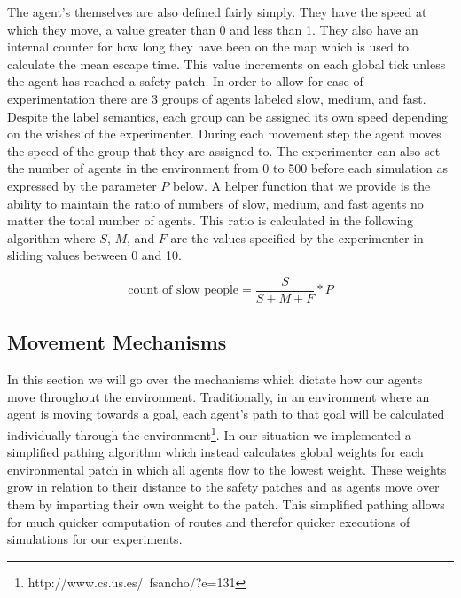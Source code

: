 \documentclass[12pt,letterpaper]{article}
\begin{document}
The agent's themselves are also defined fairly simply.  They have the speed at which they move, a value greater than 0 and less than 1.  They also have an internal counter for how long they have been on the map which is used to calculate the mean escape time.  This value increments on each global tick unless the agent has reached a safety patch.  In order to allow for ease of experimentation there are 3 groups of agents labeled slow, medium, and fast.  Despite the label semantics, each group can be assigned its own speed depending on the wishes of the experimenter.  During each movement step the agent moves the speed of the group that they are assigned to.  The experimenter can also set the number of agents in the environment from 0 to 500 before each simulation as expressed by the parameter $P$ below.  A helper function that we provide is the ability to maintain the ratio of numbers of slow, medium, and fast agents no matter the total number of agents.  This ratio is calculated in the following algorithm where $S$, $M$, and $F$ are the values specified by the experimenter in sliding values between 0 and 10.

\begin{equation}
\text{count of slow people} =\frac { S} {S + M + F} * P
\end{equation}

\subsection{Movement Mechanisms} \label{move}
In this section we will go over the mechanisms which dictate how our agents move throughout the environment.  Traditionally, in an environment where an agent is moving towards a goal, each agent's path to that goal will be calculated individually through the environment\footnote{http://www.cs.us.es/~fsancho/?e=131}.  In our situation we implemented a simplified pathing algorithm which instead calculates global weights for each environmental patch in which all agents flow to the lowest weight.  These weights grow in relation to their distance to the safety patches and as agents move over them by imparting their own weight to the patch.  This simplified pathing allows for much quicker computation of routes and therefor quicker executions of simulations for our experiments.
\end{document}
